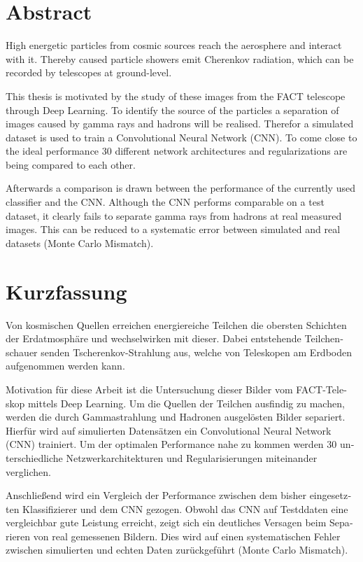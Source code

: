 \thispagestyle{plain}

\section*{Abstract}
High energetic particles from cosmic sources reach the aerosphere and interact with it.
Thereby caused particle showers emit Cherenkov radiation, which can be recorded by telescopes at ground-level.

This thesis is motivated by the study of these images from the FACT telescope through Deep Learning.
To identify the source of the particles a separation of images caused by gamma rays and hadrons will be realised.
Therefor a simulated dataset is used to train a Convolutional Neural Network (CNN).
To come close to the ideal performance \num{30} different network architectures and regularizations are being compared to each other.

Afterwards a comparison is drawn between the performance of the currently used classifier and the CNN.
Although the CNN performs comparable on a test dataset, it clearly fails to separate gamma rays from hadrons at real measured images.
This can be reduced to a systematic error between simulated and real datasets (Monte Carlo Mismatch).

\section*{Kurzfassung}
\begin{german}
Von kosmischen Quellen erreichen energiereiche Teilchen die obersten Schichten der Erdatmosphäre und wechselwirken mit dieser.
Dabei entstehende Teilchenschauer senden Tscherenkov-Strahlung aus, welche von Teleskopen am Erdboden aufgenommen werden kann.

Motivation für diese Arbeit ist die Untersuchung dieser Bilder vom FACT-Teleskop mittels Deep Learning.
Um die Quellen der Teilchen ausfindig zu machen, werden die durch Gammastrahlung und Hadronen ausgelösten Bilder separiert.
Hierfür wird auf simulierten Datensätzen ein Convolutional Neural Network (CNN) trainiert.
Um der optimalen Performance nahe zu kommen werden \num{30} unterschiedliche Netzwerkarchitekturen und Regularisierungen miteinander verglichen.

Anschließend wird ein Vergleich der Performance zwischen dem bisher eingesetzten Klassifizierer und dem CNN gezogen.
Obwohl das CNN auf Testddaten eine vergleichbar gute Leistung erreicht,
zeigt sich ein deutliches Versagen beim Separieren von real gemessenen Bildern.
Dies wird auf einen systematischen Fehler zwischen simulierten und echten Daten zurückgeführt (Monte Carlo Mismatch).
\end{german}
